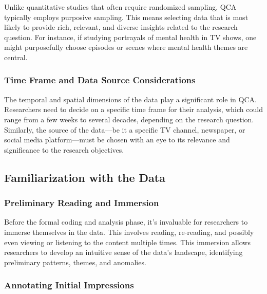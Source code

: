 \documentclass[
  b5paper]{book}
\begin{document}
Unlike quantitative studies that often require randomized sampling, QCA typically employs purposive sampling. This means selecting data that is most likely to provide rich, relevant, and diverse insights related to the research question. For instance, if studying portrayals of mental health in TV shows, one might purposefully choose episodes or scenes where mental health themes are central.

\hypertarget{time-frame-and-data-source-considerations}{%
\subsubsection*{Time Frame and Data Source Considerations}\label{time-frame-and-data-source-considerations}}

The temporal and spatial dimensions of the data play a significant role in QCA. Researchers need to decide on a specific time frame for their analysis, which could range from a few weeks to several decades, depending on the research question. Similarly, the source of the data---be it a specific TV channel, newspaper, or social media platform---must be chosen with an eye to its relevance and significance to the research objectives.

\hypertarget{familiarization-with-the-data}{%
\subsection*{Familiarization with the Data}\label{familiarization-with-the-data}}

\hypertarget{preliminary-reading-and-immersion}{%
\subsubsection*{Preliminary Reading and Immersion}\label{preliminary-reading-and-immersion}}

Before the formal coding and analysis phase, it's invaluable for researchers to immerse themselves in the data. This involves reading, re-reading, and possibly even viewing or listening to the content multiple times. This immersion allows researchers to develop an intuitive sense of the data's landscape, identifying preliminary patterns, themes, and anomalies.

\hypertarget{annotating-initial-impressions}{%
\subsubsection*{Annotating Initial Impressions}\label{annotating-initial-impressions}}
\end{document}
